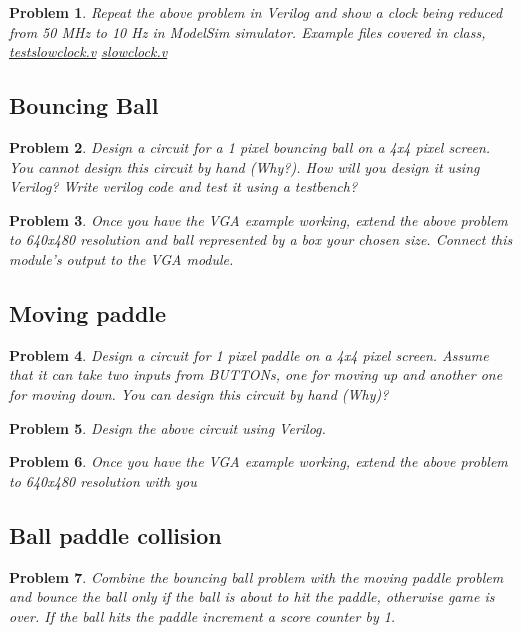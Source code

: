 \documentclass{article}
\newtheorem{prob}{Problem}
\begin{document}
\begin{prob}
  Repeat the above problem in Verilog and show a clock being reduced from 50 MHz
  to 10 Hz in ModelSim simulator. Example files covered in class,
  \href{https://vikasdhiman.info/ECE275-Sequential-Logic/lab_pdfs/ponggame-kickoff/slowclock/testslowclock.sv}{testslowclock.v}
    \href{https://vikasdhiman.info/ECE275-Sequential-Logic/lab_pdfs/ponggame-kickoff/slowclock/slowclock.sv}{slowclock.v}
\end{prob}


\subsection{Bouncing Ball}

\begin{prob}
  Design a circuit for a 1 pixel bouncing ball on a 4x4 pixel screen. You cannot design
this circuit by hand (Why?). How will you design it using Verilog? Write verilog
code and test it using a testbench?
\end{prob}

\begin{prob}
  Once you have the VGA example working, extend the above problem to 640x480
  resolution and ball represented by a box your chosen size. Connect this
  module's output to the VGA module.
\end{prob}

\subsection{Moving paddle}

\begin{prob}
 Design a circuit for 1 pixel paddle on a 4x4 pixel screen. Assume that it can
 take two inputs from BUTTONs, one for moving up and another one for moving
 down. You can design this circuit by hand (Why)?
\end{prob}

\begin{prob}
  Design the above circuit using Verilog.
\end{prob}

\begin{prob}
  Once you have the VGA example working, extend the above problem to 640x480
  resolution with you
\end{prob}

\subsection{Ball paddle collision}

\begin{prob}
  Combine the bouncing ball problem with the moving paddle problem and bounce
  the ball only if the ball is about to hit the paddle, otherwise game is over.
  If the ball hits the paddle increment a score counter by 1.
\end{prob}
\end{document}
